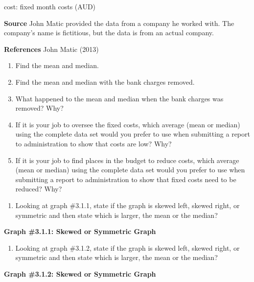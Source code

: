 \documentclass[
]{book}
\providecommand{\tightlist}{%
  \setlength{\itemsep}{0pt}\setlength{\parskip}{0pt}}
\begin{document}
cost: fixed month costs (AUD)

\textbf{Source}
John Matic provided the data from a company he worked with. The company's name is fictitious, but the data is from an actual company.

\textbf{References}
John Matic (2013)

\begin{enumerate}
\def\labelenumi{\alph{enumi}.}
\item
  Find the mean and median.
\item
  Find the mean and median with the bank charges removed.
\item
  What happened to the mean and median when the bank charges was removed? Why?
\item
  If it is your job to oversee the fixed costs, which average (mean or median) using the complete data set would you prefer to use when submitting a report to administration to show that costs are low? Why?
\item
  If it is your job to find places in the budget to reduce costs, which average (mean or median) using the complete data set would you prefer to use when submitting a report to administration to show that fixed costs need to be reduced? Why?
\end{enumerate}

\begin{enumerate}
\def\labelenumi{\arabic{enumi}.}
\setcounter{enumi}{4}
\tightlist
\item
  Looking at graph \#3.1.1, state if the graph is skewed left, skewed right, or symmetric and then state which is larger, the mean or the median?
\end{enumerate}

\textbf{Graph \#3.1.1: Skewed or Symmetric Graph}

\begin{enumerate}
\def\labelenumi{\arabic{enumi}.}
\setcounter{enumi}{5}
\tightlist
\item
  Looking at graph \#3.1.2, state if the graph is skewed left, skewed right, or symmetric and then state which is larger, the mean or the median?
\end{enumerate}

\textbf{Graph \#3.1.2: Skewed or Symmetric Graph}
\end{document}
